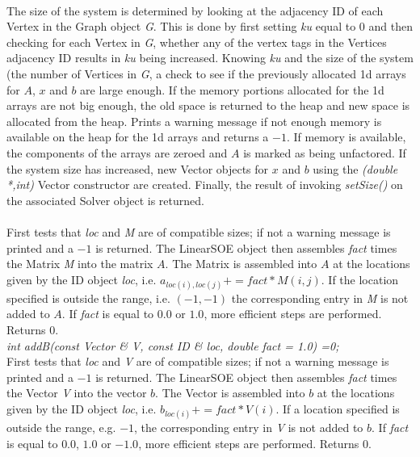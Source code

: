  \\ 
The size of the system is determined by looking at the adjacency ID of
each Vertex in the Graph object {\em G}. This is done by first setting
{\em ku} equal to $0$ and then checking for each Vertex
in {\em G}, whether any of the vertex tags in the Vertices adjacency
ID results in {\em ku} being increased. Knowing {\em ku} and the size
of the system (the number of Vertices in {\em G}, a check to see if
the previously allocated 1d arrays for $A$, $x$ and $b$ are large
enough. If the memory portions allocated for the 1d arrays are not big
enough, the old space is returned to the heap and new space is
allocated from the heap. Prints a warning message if not enough
memory is available on the heap for the 1d arrays and returns a
$-1$. If memory is available, the components of the arrays are zeroed
and $A$ is marked as being unfactored. If the system size has
increased, new Vector objects for $x$ and $b$ using the {\em (double
*,int)} Vector constructor are created. Finally, the result of
invoking {\em setSize()} on the associated Solver object is
returned. \\ 


 \\
First tests that {\em loc} and {\em M} are of compatible sizes; if not
a warning message is printed and a $-1$ is returned. The LinearSOE
object then assembles {\em fact} times the Matrix {\em 
M} into the matrix $A$. The Matrix is assembled into $A$ at the
locations given by the ID object {\em loc}, i.e. $a_{loc(i),loc(j)} +=
fact * M(i,j)$. If the location specified is outside the range,
i.e. $(-1,-1)$ the corresponding entry in {\em M} is not added to
$A$. If {\em fact} is equal to $0.0$ or $1.0$, more efficient steps
are performed. Returns $0$.  \\


{\em int addB(const Vector \& V, const ID \& loc,
double fact = 1.0) =0;} \\
First tests that {\em loc} and {\em V} are of compatible sizes; if not
a warning message is printed and a $-1$ is returned. The LinearSOE
object then assembles {\em fact} times the Vector {\em V} into
the vector $b$. The Vector is assembled into $b$ at the locations
given by the ID object {\em loc}, i.e. $b_{loc(i)} += fact * V(i)$. If a
location specified is outside the range, e.g. $-1$, the corresponding
entry in {\em V} is not added to $b$. If {\em fact} is equal to $0.0$,
$1.0$ or $-1.0$, more efficient steps are performed. Returns $0$. \\



